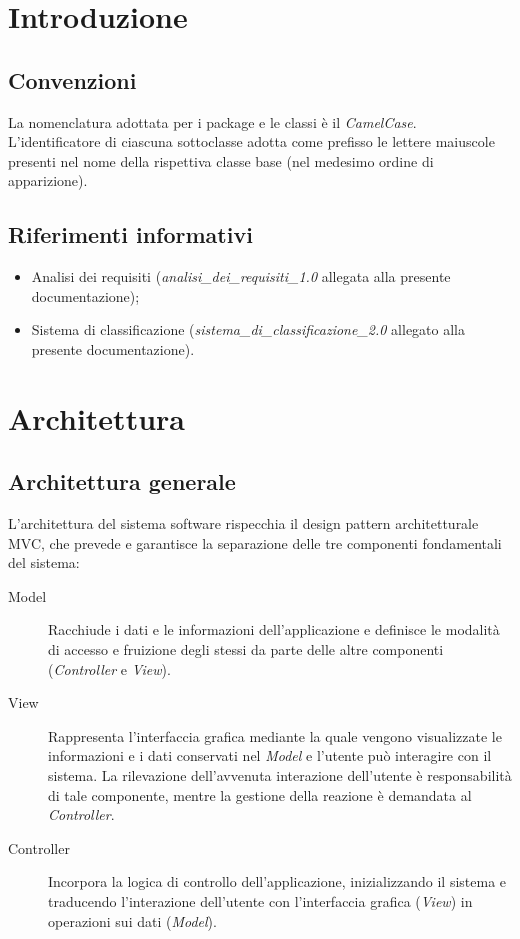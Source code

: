 \documentclass[10pt,a4paper,headinclude,footinclude,hidelinks]{scrreprt} %
\begin{document}
	\tableofcontents

	\listoffigures

	\chapter{Introduzione}
	\label{ch:stage:design:intro}

	\section{Convenzioni}
	La nomenclatura adottata per i package e le classi è il \textit{CamelCase}.	L'identificatore di ciascuna sottoclasse adotta come prefisso le lettere maiuscole presenti nel nome della rispettiva classe base (nel medesimo ordine di apparizione).

	\section{Riferimenti informativi}
	\begin{itemize}
	\item Analisi dei requisiti (\textit{analisi\_dei\_requisiti\_1.0} allegata alla presente documentazione);
	\item Sistema di classificazione (\textit{sistema\_di\_classificazione\_2.0} allegato alla presente documentazione).
	\end{itemize}

	\chapter{Architettura}
	\label{ch:stage:design:architettura}

	\section{Architettura generale}
	\label{sec:stage:design:architettura:mvc}
	L'architettura del sistema software rispecchia il design pattern architetturale MVC, che prevede e garantisce la separazione delle tre componenti fondamentali del sistema:
	\begin{description}
	\item[Model] Racchiude i dati e le informazioni dell'applicazione e definisce le modalità di accesso e fruizione degli stessi da parte delle altre componenti (\textit{Controller} e \textit{View}).
 	\item[View] Rappresenta l'interfaccia grafica mediante la quale vengono visualizzate le informazioni e i dati conservati nel \textit{Model} e l'utente può interagire con il sistema. La rilevazione dell'avvenuta interazione dell'utente è responsabilità di tale componente, mentre la gestione della reazione è demandata al \textit{Controller}.
	\item[Controller] Incorpora la logica di controllo dell'applicazione, inizializzando il sistema e traducendo l'interazione dell'utente con l'interfaccia grafica (\textit{View}) in operazioni sui dati (\textit{Model}).
	\end{description}
\end{document}

